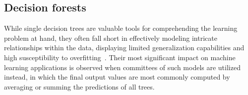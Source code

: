 %
%
%
%


\subsection{Decision forests}
\label{sec:decision forests}

While single decision trees are valuable tools for comprehending the learning problem at hand, they often fall short in effectively modeling intricate relationships within the data, displaying limited generalization capabilities and high susceptibility to overfitting~\cite{}.
%
Their most significant impact on machine learning applications is observed when committees of such models are utilized instead, in which the final output values are most commonly computed by averaging or summing the predictions of all trees.

